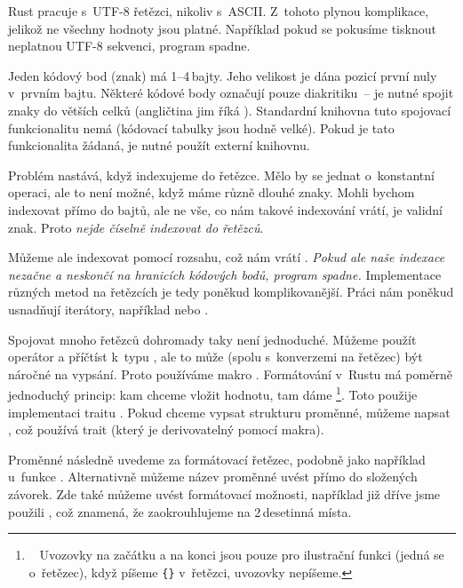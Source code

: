 \documentclass[main.tex]{subfiles}
\begin{document}

Rust pracuje s~UTF-8 řetězci, nikoliv s~ASCII. Z~tohoto plynou komplikace, jelikož ne
všechny hodnoty jsou platné. Například pokud se pokusíme tisknout neplatnou UTF-8
sekvenci, program spadne.


Jeden kódový bod (znak) má 1--4\,bajty. Jeho velikost je dána pozicí první nuly v~prvním
bajtu. Některé kódové body označují pouze diakritiku~-- je nutné spojit znaky do větších
celků (angličtina jim říká ). Standardní knihovna tuto spojovací
funkcionalitu nemá (kódovací tabulky jsou hodně velké). Pokud je tato funkcionalita
žádaná, je nutné použít externí knihovnu. \cite[sekce\,8.2]{thebook}


Problém nastává, když indexujeme do řetězce. Mělo by se jednat o~konstantní operaci, ale
to není možné, když máme různě dlouhé znaky. Mohli bychom indexovat přímo do bajtů, ale ne
vše, co nám takové indexování vrátí, je validní znak. Proto
\emph{nejde číselně indexovat do řetězců}.

Můžeme ale indexovat pomocí rozsahu, což nám vrátí . \emph{Pokud ale naše
    indexace nezačne a neskončí na hranicích kódových bodů, program spadne.} Implementace
různých metod na řetězcích je tedy poněkud komplikovanější. Práci nám poněkud usnadňují
iterátory, například  nebo . \cite[sekce\,8.2]{thebook}


Spojovat mnoho řetězců dohromady taky není jednoduché. Můžeme použít \irust{+} operátor a
příčtíst  k~typu , ale to může (spolu s~konverzemi na řetězec)
být náročné na vypsání. Proto používáme makro . Formátování v~Rustu má
poměrně jednoduchý princip: kam chceme vložit hodnotu, tam dáme \footnote{~
    Uvozovky na začátku a na konci jsou pouze pro ilustrační funkci (jedná se o~řetězec),
    když píšeme \texttt{\{\}} v~řetězci, uvozovky nepíšeme.
}. Toto použije implementaci traitu . Pokud chceme vypsat strukturu
proměnné, můžeme napsat , což používá  trait (který je
derivovatelný pomocí makra). \cite[sekce\,8.2]{thebook}

Proměnné následně uvedeme za formátovací řetězec, podobně jako například u~funkce
. Alternativně můžeme název proměnné uvést přímo do složených závorek. Zde
také můžeme uvést formátovací možnosti, například již dříve jsme použili ,
což znamená, že zaokrouhlujeme na 2\,desetinná místa.
\end{document}
